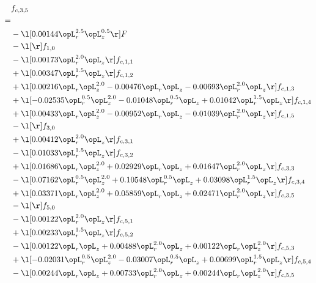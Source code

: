 \begin{alignat}{2} 
\label{eq:f_35_1} 
& f_{c,3,5} \nonumber \\ 
 = \\ 
& - \l[  0.00144 \opL_r^{2.5} \opL_z^{0.5}  \r] F \nonumber \\ 
& - \l[  \r] f_{1,0} \nonumber \\ 
& - \l[  0.00173 \opL_r^{2.0} \opL_z  \r] f_{c,1,1} \nonumber \\ 
& + \l[  0.00347 \opL_r^{1.5} \opL_z  \r] f_{c,1,2} \nonumber \\ 
& + \l[  0.00216 \opL_r \opL_z^{2.0}   -0.00476 \opL_r \opL_z   -0.00693 \opL_r^{2.0} \opL_z  \r] f_{c,1,3} \nonumber \\ 
& + \l[  -0.02535 \opL_r^{0.5} \opL_z^{2.0}   -0.01048 \opL_r^{0.5} \opL_z +  0.01042 \opL_r^{1.5} \opL_z  \r] f_{c,1,4} \nonumber \\ 
& + \l[  0.00433 \opL_r \opL_z^{2.0}   -0.00952 \opL_r \opL_z   -0.01039 \opL_r^{2.0} \opL_z  \r] f_{c,1,5} \nonumber \\ 
& - \l[  \r] f_{3,0} \nonumber \\ 
& + \l[  0.00412 \opL_r^{2.0} \opL_z  \r] f_{c,3,1} \nonumber \\ 
& - \l[  0.01033 \opL_r^{1.5} \opL_z  \r] f_{c,3,2} \nonumber \\ 
& + \l[  0.01686 \opL_r \opL_z^{2.0} +  0.02929 \opL_r \opL_z +  0.01647 \opL_r^{2.0} \opL_z  \r] f_{c,3,3} \nonumber \\ 
& - \l[  0.07162 \opL_r^{0.5} \opL_z^{2.0} +  0.10548 \opL_r^{0.5} \opL_z +  0.03098 \opL_r^{1.5} \opL_z  \r] f_{c,3,4} \nonumber \\ 
& + \l[  0.03371 \opL_r \opL_z^{2.0} +  0.05859 \opL_r \opL_z +  0.02471 \opL_r^{2.0} \opL_z  \r] f_{c,3,5} \nonumber \\ 
& - \l[  \r] f_{5,0} \nonumber \\ 
& - \l[  0.00122 \opL_r^{2.0} \opL_z  \r] f_{c,5,1} \nonumber \\ 
& + \l[  0.00233 \opL_r^{1.5} \opL_z  \r] f_{c,5,2} \nonumber \\ 
& - \l[  0.00122 \opL_r \opL_z +  0.00488 \opL_r^{2.0} \opL_z +  0.00122 \opL_r \opL_z^{2.0}  \r] f_{c,5,3} \nonumber \\ 
& + \l[  -0.02031 \opL_r^{0.5} \opL_z^{2.0}   -0.03007 \opL_r^{0.5} \opL_z +  0.00699 \opL_r^{1.5} \opL_z  \r] f_{c,5,4} \nonumber \\ 
& - \l[  0.00244 \opL_r \opL_z +  0.00733 \opL_r^{2.0} \opL_z +  0.00244 \opL_r \opL_z^{2.0}  \r] f_{c,5,5} \nonumber \\ 

\end{alignat}
